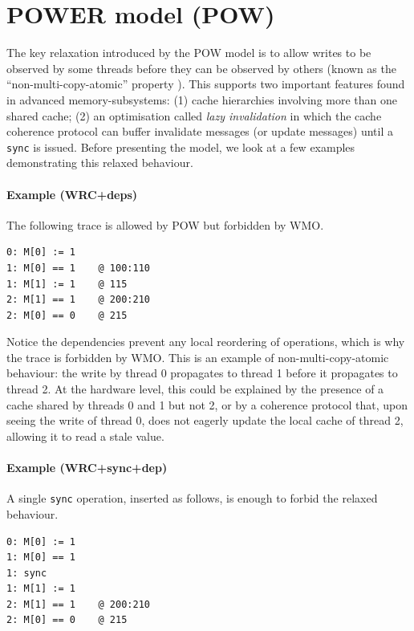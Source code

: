 \documentclass[11pt]{article}
\begin{document}
\section{POWER model (POW)}
\label{Section:POWERModel}

The key relaxation introduced by the POW model is to allow writes to
be observed by some threads before they can be observed by others
(known as the ``non-multi-copy-atomic'' property \cite{POWER}).  This
supports two important features found in advanced memory-subsystems:
(1) cache hierarchies involving more than one shared cache; (2) an
optimisation called \emph{lazy invalidation} in which the cache
coherence protocol can buffer invalidate messages (or update
messages) until a \verb!sync! is issued.  Before presenting the model,
we look at a few examples demonstrating this relaxed behaviour.

\paragraph{Example (WRC+deps)}  The following trace is allowed by POW
but forbidden by WMO.

\begin{verbatim}
0: M[0] := 1
1: M[0] == 1    @ 100:110
1: M[1] := 1    @ 115
2: M[1] == 1    @ 200:210
2: M[0] == 0    @ 215
\end{verbatim}

\noindent Notice the dependencies prevent any local reordering of
operations, which is why the trace is forbidden by WMO.  This is an
example of non-multi-copy-atomic behaviour: the write by thread 0
propagates to thread 1 before it propagates to thread 2.  At the
hardware level, this could be explained by the presence of a cache
shared by threads 0 and 1 but not 2, or by a coherence protocol that,
upon seeing the write of thread 0, does not eagerly update the local
cache of thread 2, allowing it to read a stale value.


\paragraph{Example (WRC+sync+dep)} A single \verb'sync' operation,
inserted as follows, is enough to forbid the relaxed behaviour.

\begin{verbatim}
0: M[0] := 1
1: M[0] == 1
1: sync
1: M[1] := 1
2: M[1] == 1    @ 200:210
2: M[0] == 0    @ 215
\end{verbatim}
\end{document}
